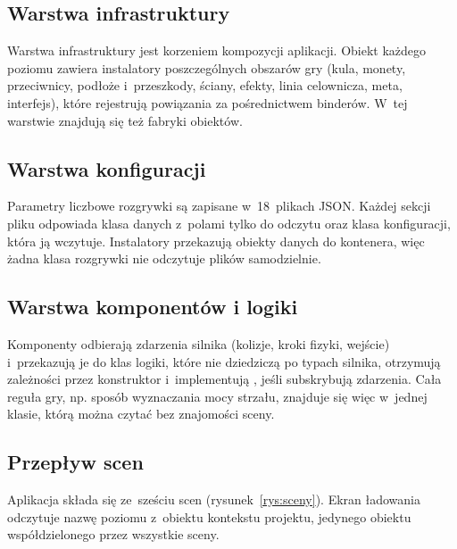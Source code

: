 \subsection{Warstwa infrastruktury}

Warstwa infrastruktury jest korzeniem kompozycji aplikacji. Obiekt 
każdego poziomu zawiera instalatory poszczególnych obszarów gry (kula, monety, przeciwnicy,
podłoże i~przeszkody, ściany, efekty, linia celownicza, meta, interfejs), które rejestrują
powiązania za pośrednictwem binderów. W~tej warstwie znajdują się też fabryki obiektów.

\subsection{Warstwa konfiguracji}

Parametry liczbowe rozgrywki są zapisane w~18~plikach JSON. Każdej sekcji pliku odpowiada
klasa danych z~polami tylko do odczytu oraz klasa konfiguracji, która ją wczytuje.
Instalatory przekazują obiekty danych do kontenera, więc żadna klasa rozgrywki nie
odczytuje plików samodzielnie.

\subsection{Warstwa komponentów i logiki}

Komponenty  odbierają zdarzenia silnika (kolizje, kroki fizyki,
wejście) i~przekazują je do klas logiki, które nie dziedziczą po typach silnika,
otrzymują zależności przez konstruktor i~implementują , jeśli
subskrybują zdarzenia. Cała reguła gry, np. sposób wyznaczania mocy strzału, znajduje się
więc w~jednej klasie, którą można czytać bez znajomości sceny.

\subsection{Przepływ scen}

Aplikacja składa się ze~sześciu scen (rysunek~\ref{rys:sceny}). Ekran ładowania odczytuje
nazwę poziomu z~obiektu  kontekstu projektu, jedynego obiektu
współdzielonego przez wszystkie sceny.

